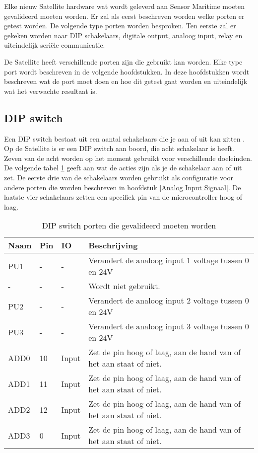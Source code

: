 Elke nieuw Satellite hardware wat wordt geleverd aan Sensor Maritime moeten gevalideerd moeten worden. Er zal als eerst beschreven worden welke porten er getest worden. De volgende type porten worden besproken. Ten eerste zal er gekeken worden naar DIP schakelaars, digitale output, analoog input, relay en uiteindelijk seriële communicatie. \newline

\noindent De Satellite heeft verschillende porten zijn die gebruikt kan worden. Elke type port wordt beschreven in de volgende hoofdstukken. In deze hoofdstukken wordt beschreven wat de port moet doen en hoe dit getest gaat worden en uiteindelijk wat het verwachte resultaat is.

\subsection{DIP switch}
Een DIP switch bestaat uit een aantal schakelaars die je aan of uit kan zitten \autocite{DIP}. Op de Satellite is er een DIP switch aan boord, die acht schakelaar is heeft. Zeven van de acht worden op het moment gebruikt voor verschillende doeleinden. De volgende tabel \ref{tab:hw_val_dip} geeft aan wat de acties zijn als je de schakelaar aan of uit zet. De eerste drie van de schakelaars worden gebruikt als configuratie voor andere porten die worden beschreven in hoofdstuk \ref{Analog Input Signaal}. De laatste vier schakelaars zetten een specifiek pin van de microcontroller hoog of laag.
\begin{table}[h!]
	\caption{DIP switch porten die gevalideerd moeten worden}
	\begin{tabular}{lllp{12cm}}
	\toprule
	\textbf{Naam} & \textbf{Pin} & \textbf{IO} & \textbf{Beschrijving}	\\ \toprule
	PU1		& - 	& -    		& Verandert de analoog input 1 voltage tussen 0 en 24V	\\
	-		& - 	& -    		& Wordt niet gebruikt.								\\
	PU2		& - 	& -    		& Verandert de analoog input 2 voltage tussen 0 en 24V	\\
	PU3		& - 	& -    		& Verandert de analoog input 3 voltage tussen 0 en 24V	\\
	ADD0 	& 10	& Input		& Zet de pin hoog of laag, aan de hand van of het aan staat of niet.		\\
	ADD1 	& 11	& Input		& Zet de pin hoog of laag, aan de hand van of het aan staat of niet.		\\
	ADD2 	& 12	& Input		& Zet de pin hoog of laag, aan de hand van of het aan staat of niet.		\\
	ADD3 	& 0 	& Input		& Zet de pin hoog of laag, aan de hand van of het aan staat of niet.		\\ \bottomrule
	\end{tabular}
	\label{tab:hw_val_dip}
\end{table}

